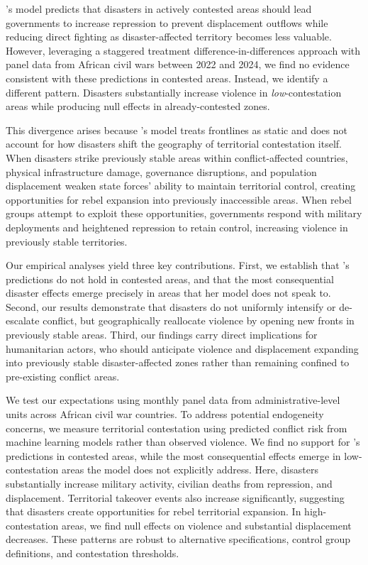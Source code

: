 \documentclass[bibtex]{article}
\begin{document}
\citeauthor{sun2024strategic}'s \citeyearpar{sun2024strategic} model predicts that disasters in actively contested areas should lead governments to increase repression to prevent displacement outflows while reducing direct fighting as disaster-affected territory becomes less valuable. However, leveraging a staggered treatment difference-in-differences approach with panel data from African civil wars between 2022 and 2024, we find no evidence consistent with these predictions in contested areas. Instead, we identify a different pattern. Disasters substantially increase violence in \emph{low}-contestation areas while producing null effects in already-contested zones.

This divergence arises because \citeauthor{sun2024strategic}'s \citeyearpar{sun2024strategic} model treats frontlines as static and does not account for how disasters shift the geography of territorial contestation itself. When disasters strike previously stable areas within conflict-affected countries, physical infrastructure damage, governance disruptions, and population displacement weaken state forces' ability to maintain territorial control, creating opportunities for rebel expansion into previously inaccessible areas. When rebel groups attempt to exploit these opportunities, governments respond with military deployments and heightened repression to retain control, increasing violence in previously stable territories.

Our empirical analyses yield three key contributions. First, we establish that \citeauthor{sun2024strategic}'s \citeyearpar{sun2024strategic} predictions do not hold in contested areas, and that the most consequential disaster effects emerge precisely in areas that her model does not speak to. Second, our results demonstrate that disasters do not uniformly intensify or de-escalate conflict, but geographically reallocate violence by opening new fronts in previously stable areas. Third, our findings carry direct implications for humanitarian actors, who should anticipate violence and displacement expanding into previously stable disaster-affected zones rather than remaining confined to pre-existing conflict areas.

We test our expectations using monthly panel data from administrative-level units across African civil war countries. To address potential endogeneity concerns, we measure territorial contestation using predicted conflict risk from machine learning models \citep{mueller_rauh2022} rather than observed violence. We find no support for \citeauthor{sun2024strategic}'s \citeyearpar{sun2024strategic} predictions in contested areas, while the most consequential effects emerge in low-contestation areas the model does not explicitly address. Here, disasters substantially increase military activity, civilian deaths from repression, and displacement. Territorial takeover events also increase significantly, suggesting that disasters create opportunities for rebel territorial expansion. In high-contestation areas, we find null effects on violence and substantial displacement decreases. These patterns are robust to alternative specifications, control group definitions, and contestation thresholds.
\end{document}
